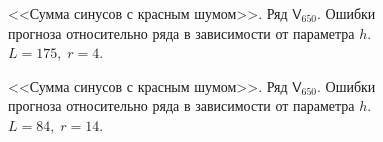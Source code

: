 \documentclass[specialist,
               substylefile = spbu.rtx,
               subf,href,colorlinks=true, 12p]{disser}
\begin{document}
\begin{figure}[H]
	\captionsetup{justification=centering}
	\caption{<<Сумма синусов с красным шумом>>. Ряд $\mathsf{V}_{650}$. Ошибки прогноза относительно ряда в зависимости от параметра $h$. $L = 175, \; r = 4$.}
	\label{serr_r4.h}
\end{figure}

\begin{figure}[H]
	\captionsetup{justification=centering}
	\caption{<<Сумма синусов с красным шумом>>. Ряд $\mathsf{V}_{650}$. Ошибки прогноза относительно ряда в зависимости от параметра $h$. $L = 84, \; r = 14$.}
	\label{serr_r14.h}
\end{figure}
\end{document}
